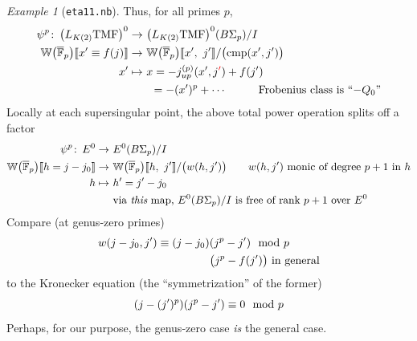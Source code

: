 \documentclass{rs}
\theoremstyle{definition}
\theoremstyle{remark}
\newtheorem{ex}[thm]{Example}
\def\co{\colon\thinspace}
\newcommand{\mb}[1]{\mathbb{#1}}
\newcommand{\cF}{\overline {\mb F}}
\newcommand{\cmp}{{\rm cmp}}
\newcommand{\BW}{{\mb W}}
\newcommand{\md}{~~{\rm mod}~}
\newcommand{\TMF}{{\rm TMF}}
\newcommand{\lb}{\llbracket}
\newcommand{\rb}{\rrbracket}
\renewcommand{\=}{\approx}
\renewcommand{\-}{\sim}
\newcommand{\rd}[1]{\textcolor{red}{#1}}
\numberwithin{equation}{section}
\numberwithin{thm}{section}
\begin{document}
\begin{ex}[\texttt{eta11.nb}]
 Thus, for all primes $p$, 
 \begin{equation*}
  \begin{split}
        \psi^p \co \big(L_{K(2)}\TMF\big)^0 \to & ~ \big(L_{K(2)}\TMF\big)^0(B\Sigma_p) / I \\
   \BW\big(\cF_p\big)\lb x' \equiv f(j) \rb \to & ~ \BW\big(\cF_p\big)\lb x', ~ j' \rb / \big(\cmp(x',j')\big) \\
                                     x' \mapsto & ~ x = -j_{u p}^{(p)}(x',j\rd{'}) + f(j') \\
                                                & \hskip .25cm = -(x')^p + \cdots \hskip 1cm \text{Frobenius class is ``$-Q_0$''} 
  \end{split}
 \end{equation*}
 Locally at each supersingular point, the above total power operation splits off a factor 
 \begin{equation*}
  \begin{split}
                          \psi^p \co E^0 \to & ~ E^0(B\Sigma_p) / I \\
   \BW\big(\cF_p\big)\lb h = j - j_0 \rb \to & ~ \BW\big(\cF_p\big)\lb h, ~ j' \rb / \big(w(h,j')\big) \qquad \text{$w(h,j')$ monic of degree $p + 1$ in $h$} \\
                                   h \mapsto & ~ h' = j' - j_0 \\
                                             & ~ \text{via {\em this} map, $E^0(B\Sigma_p) / I$ is free of rank $p + 1$ over $E^0$} 
  \end{split}
 \end{equation*}
 Compare (at genus-zero primes) 
 \begin{equation*}
  \begin{split}
   w(j - j_0, j') \equiv (j - j_0) & (j^p - j') \md p \\
   & \big(j^p - f(j')\big) ~ \text{in general} 
  \end{split}
 \end{equation*}
 to the Kronecker equation (the ``symmetrization'' of the former) 
 \[
  (j - (j')^p) (j^p - j') \equiv 0 \md p 
 \]
 Perhaps, for our purpose, the genus-zero case {\em is} the general case.  
\end{ex}
\end{document}
